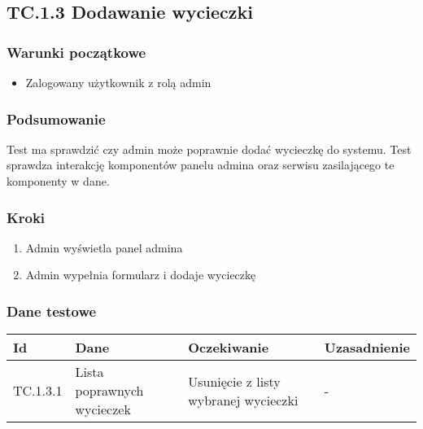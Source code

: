 \documentclass[a4paper,15pt]{article}
\begin{document}
\newpage
\begin{framed}
\subsection{TC.1.3 Dodawanie wycieczki}

\vspace{0.5cm}

\subsubsection{Warunki początkowe}
\begin{itemize}
\item Zalogowany użytkownik z rolą admin
\end{itemize}

\subsubsection{Podsumowanie}
Test ma sprawdzić czy admin może poprawnie dodać wycieczkę do systemu. Test sprawdza interakcję komponentów panelu admina oraz serwisu zasilającego te komponenty w dane. 

\subsubsection{Kroki}
\begin{enumerate}
\item Admin wyświetla panel admina
\item Admin wypełnia formularz i dodaje wycieczkę
\end{enumerate}

\subsubsection{Dane testowe}

\begin{center}
\begin{tabular}{ |C{1.5cm}|C{3cm}|C{4cm}|C{4cm}| } 
 \hline
 \textbf{Id} & \textbf{Dane} & \textbf{Oczekiwanie} & \textbf{Uzasadnienie} \\ \hline
 TC.1.3.1 & Lista poprawnych wycieczek & Usunięcie z listy wybranej wycieczki & - \\ \hline
\end{tabular}
\end{center}

\end{framed}
\end{document}
